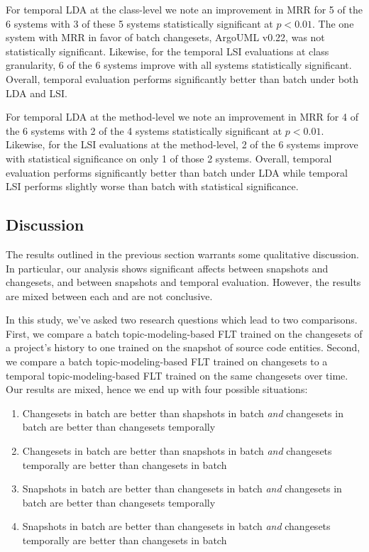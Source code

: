 For temporal LDA at the class-level we note an improvement in MRR for 5 of the 6 systems
with 3 of these 5 systems statistically significant at $p<0.01$.
The one system with MRR in favor of batch changesets, ArgoUML v0.22, was not statistically significant.
Likewise, for the temporal LSI evaluations at class granularity, 6 of the 6 systems improve
with all systems statistically significant.
Overall, temporal evaluation performs significantly better than batch under both LDA and LSI.

For temporal LDA at the method-level we note an improvement in MRR for 4 of the 6 systems
with 2 of the 4 systems statistically significant at $p<0.01$.
Likewise, for the LSI evaluations at the method-level, 2 of the 6 systems improve
with statistical significance on only 1 of those 2 systems.
Overall, temporal evaluation performs significantly better than batch under LDA
while temporal LSI performs slightly worse than batch with statistical significance.



\subsection{Discussion}

The results outlined in the previous section warrants some qualitative discussion.
In particular, our analysis shows significant affects between snapshots and changesets,
and between snapshots and temporal evaluation.
However, the results are mixed between each and are not conclusive.

In this study, we've asked two research questions which lead to two comparisons.
First, we compare a batch topic-modeling-based FLT trained on the changesets
of a project's history to one trained on the snapshot of source code entities.
Second, we compare a batch topic-modeling-based FLT trained on changesets
to a temporal topic-modeling-based FLT trained on the same changesets over time.
Our results are mixed, hence we end up with four possible situations:

\begin{enumerate}
    \item Changesets in batch are better than shapshots in batch \emph{and}
        changesets in batch are better than changesets temporally
    \item Changesets in batch are better than snapshots in batch \emph{and}
        changesets temporally are better than changesets in batch
    \item Snapshots in batch are better than changesets in batch \emph{and}
        changesets in batch are better than changesets temporally
    \item Snapshots in batch are better than changesets in batch \emph{and}
        changesets temporally are better than changesets in batch
\end{enumerate}

